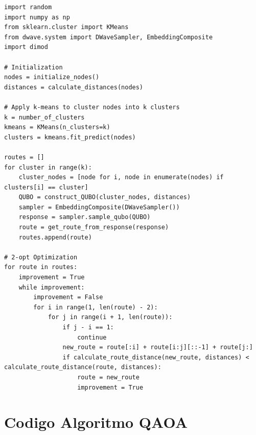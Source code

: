 \documentclass[11pt,a4paper,spanish]{book}
\begin{document}
\begin{lstlisting}
import random
import numpy as np
from sklearn.cluster import KMeans
from dwave.system import DWaveSampler, EmbeddingComposite
import dimod

# Initialization
nodes = initialize_nodes()
distances = calculate_distances(nodes)

# Apply k-means to cluster nodes into k clusters
k = number_of_clusters
kmeans = KMeans(n_clusters=k)
clusters = kmeans.fit_predict(nodes)

routes = []
for cluster in range(k):
    cluster_nodes = [node for i, node in enumerate(nodes) if clusters[i] == cluster]
    QUBO = construct_QUBO(cluster_nodes, distances)
    sampler = EmbeddingComposite(DWaveSampler())
    response = sampler.sample_qubo(QUBO)
    route = get_route_from_response(response)
    routes.append(route)

# 2-opt Optimization
for route in routes:
    improvement = True
    while improvement:
        improvement = False
        for i in range(1, len(route) - 2):
            for j in range(i + 1, len(route)):
                if j - i == 1:
                    continue
                new_route = route[:i] + route[i:j][::-1] + route[j:]
                if calculate_route_distance(new_route, distances) < calculate_route_distance(route, distances):
                    route = new_route
                    improvement = True
\end{lstlisting}


\section{Codigo Algoritmo QAOA}
\end{document}
